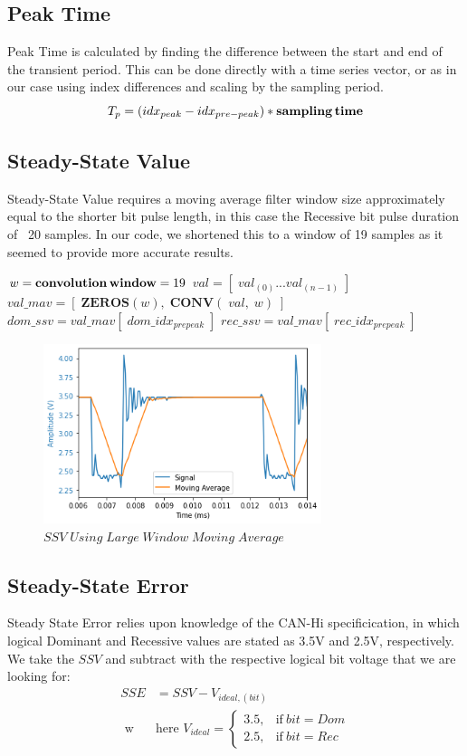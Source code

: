 \documentclass[conference]{IEEEtran}
\begin{document}
\subsection{Peak Time}
Peak Time is calculated by finding the difference between the start and end of the transient period. This can be done directly with a time series vector, or as in our case using index differences and scaling by the sampling period.
\begin{equation*}
T_p = (idx_{peak} - idx_{pre-peak}) * \textbf{sampling\,time}   
\end{equation*}

\subsection{Steady-State Value} \label{sec:SSV}
Steady-State Value requires a moving average filter window size approximately equal to the shorter bit pulse length, in this case the Recessive bit pulse duration of ~20 samples. In our code, we shortened this to a window of 19 samples as it seemed to provide more accurate results.
\medbreak
\begin{algorithmic}
\STATE $w = \textbf{convolution\,window} = 19$
\STATE $val = [\;val_{(0)} ... val_{(n-1)}\;] $
\STATE $val\_mav = [\;\textbf{ZEROS}(w),\;\textbf{CONV}(\;val,\;w)\;] $
\STATE $dom\_ssv = val\_mav[\;dom\_idx_{prepeak}\;]$
\STATE $rec\_ssv = val\_mav[\;rec\_idx_{prepeak}\;]$
\end{algorithmic}
\medbreak

\begin{figure}[htb]
\centering
\includegraphics[width=3.2in]{figures/52_ssv.png}
\caption{$SSV\;Using\;Large\;Window\;Moving\;Average$}
\label{fig:SSV}
\end{figure}

\subsection{Steady-State Error} \label{sec:SSE}
Steady State Error relies upon knowledge of the CAN-Hi specificication, in which logical Dominant and Recessive values are stated as 3.5V and 2.5V, respectively. We take the $SSV$ and subtract with the respective logical bit voltage that we are looking for:
\begin{align*}
SSE &= SSV - V_{ideal,(bit)} \\ \text{ w} & \text{here } V_{ideal} =
    \begin{cases}
      3.5, & \text{if}\ bit=Dom \\
      2.5, & \text{if}\ bit=Rec 
    \end{cases}
\end{align*}
\end{document}
